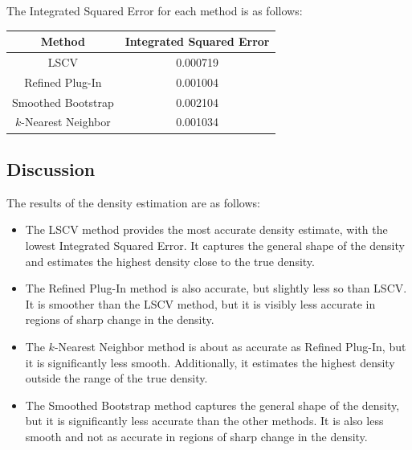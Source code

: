 \documentclass{article}
\begin{document}
The Integrated Squared Error for each method is as follows:

\begin{table}[H]
\centering
\begin{tabular}{|c|c|}
\hline
\textbf{Method} & \textbf{Integrated Squared Error} \\ \hline
LSCV & 0.000719 \\ \hline
Refined Plug-In & 0.001004 \\ \hline
Smoothed Bootstrap & 0.002104 \\ \hline
\(k\)-Nearest Neighbor & 0.001034 \\ \hline
\end{tabular}
\end{table}

\subsection{Discussion}

The results of the density estimation are as follows:

\begin{itemize}
  \item The LSCV method provides the most accurate density estimate, with the lowest Integrated Squared Error. It captures the general shape of the density and estimates the highest density close to the true density.
  \item The Refined Plug-In method is also accurate, but slightly less so than LSCV. It is smoother than the LSCV method, but it is visibly less accurate in regions of sharp change in the density.
  \item The \(k\)-Nearest Neighbor method is about as accurate as Refined Plug-In, but it is significantly less smooth. Additionally, it estimates the highest density outside the range of the true density.
  \item The Smoothed Bootstrap method captures the general shape of the density, but it is significantly less accurate than the other methods. It is also less smooth and not as accurate in regions of sharp change in the density.
\end{itemize}
\end{document}
